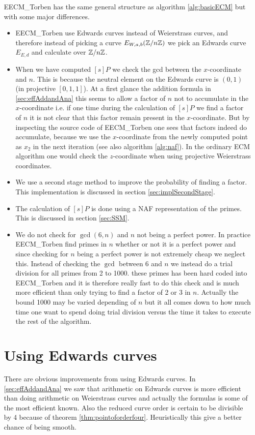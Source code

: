 EECM\_Torben has the same general structure as algorithm \ref{alg:basicECM} but with some major differences.
\begin{itemize}
\item EECM\_Torben use Edwards curves instead of Weierstrass curves, and therefore instead of picking a curve $E_{W,a,b}(\mathbb{Z}/n\mathbb{Z})$ we pick an Edwards curve $E_{E,d}$ and calculate over $\mathbb{Z}/n\mathbb{Z}$. 
\item When we have computed $[s]P$ we check the gcd between the $x$-coordinate and $n$. This is because the neutral element on the Edwards curve is $(0,1)$ (in projective $[0,1,1]$). At a first glance the addition formula in \ref{sec:effAddandAna} this seems to allow a factor of $n$ not to accumulate in the $x$-coordinate i.e. if one time during the calculation of $[s]P$ we find a factor of $n$ it is not clear that this factor remain present in the $x$-coordinate. But by inspecting the source code of EECM\_Torben one sees that factors indeed do accumulate, because we use the $x$-coordinate from the newly computed point as $x_2$ in the next iteration (see also algorithm \ref{alg:naf}). In the ordinary ECM algorithm one would check the $z$-coordinate when using projective Weierstrass coordinates. 
\item We use a second stage method to improve the probability of finding a factor. This implementation is discussed in section \ref{sec:implSecondStage}.
\item The calculation of $[s]P$ is done using a NAF representation of the primes. This is discussed in section \ref{sec:SSM}.
\item We do not check for $\gcd(6,n)$ and $n$ not being a perfect power. In practice EECM\_Torben find primes in $n$ whether or not it is a perfect power and since checking for $n$ being a perfect power is not extremely cheap we neglect this. Instead of checking the $\gcd$ between 6 and $n$ we instead do a trial division for all primes from 2 to 1000. these primes has been hard coded into EECM\_Torben and it is therefore really fast to do this check and is much more efficient than only trying to find a factor of 2 or 3 in $n$. Actually the bound 1000 may be varied depending of $n$ but it all comes down to how much time one want to spend doing trial division versus the time it takes to execute the rest of the algorithm. 
\end{itemize}

\section{Using Edwards curves}\label{sec:usingEDC}
There are obvious improvements from using Edwards curves. In \ref{sec:effAddandAna} we saw that arithmetic on Edwards curves is more efficient than doing arithmetic on Weierstrass curves and actually the formulas is some of the most efficient known. Also the reduced curve order is certain to be divisible by 4 because of theorem \ref{thm:pointoforderfour}. Heuristically this give a better chance of being smooth.


